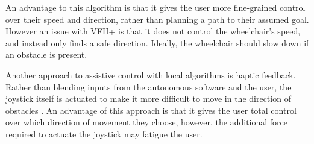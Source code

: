 An advantage to this algorithm is that it gives the user more fine-grained control over their speed and direction,
rather than planning a path to their assumed goal.
However an issue with VFH+ is that it does not control the wheelchair's speed, and instead only finds a safe direction.
Ideally, the wheelchair should slow down if an obstacle is present.

Another approach to assistive control with local algorithms is haptic feedback. Rather than
blending inputs from the autonomous software and the user, the joystick itself is actuated
to make it more difficult to move in the direction of obstacles \cite{kondoNavigationGuidanceControl2008}\cite{vanderpoortenPoweredWheelchairNavigation2012}.
An advantage of this approach is that it gives the user total control over which direction of movement they choose,
however, the additional force required to actuate the joystick may fatigue the user.





